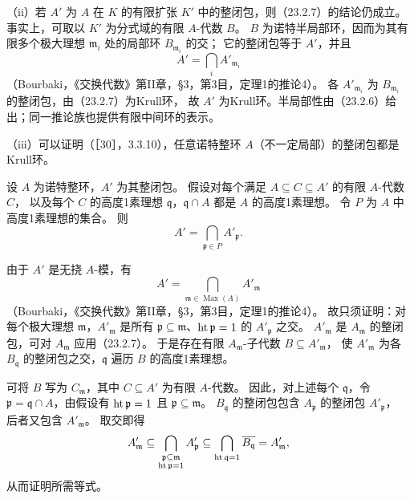 （ii）若 $A'$ 为 $A$ 在 $K$ 的有限扩张 $K'$ 中的整闭包，则（23.2.7）的结论仍成立。
事实上，可取以 $K'$ 为分式域的有限 $A$-代数 $B$。
$B$ 为诺特半局部环，因而为其有限多个极大理想 $\mathfrak m_i$ 处的局部环 $B_{\mathfrak m_i}$ 的交；
它的整闭包等于 $A'$，并且
\[
 A'=\bigcap_i A'_{\mathfrak m_i}
\]
（Bourbaki，《交换代数》第II章，\S3，第3目，定理1的推论4）。
各 $A'_{\mathfrak m_i}$ 为 $B_{\mathfrak m_i}$ 的整闭包，由（23.2.7）为Krull环，
故 $A'$ 为Krull环。半局部性由（23.2.6）给出；同一推论族也提供有限中间环的表示。

（iii）可以证明（［30］，3.3.10），任意诺特整环 $A$（不一定局部）的整闭包都是Krull环。

设 $A$ 为诺特整环，$A'$ 为其整闭包。
假设对每个满足 $A\subseteq C\subseteq A'$ 的有限 $A$-代数 $C$，
以及每个 $C$ 的高度1素理想 $\mathfrak q$，$\mathfrak q\cap A$ 都是 $A$ 的高度1素理想。
令 $P$ 为 $A$ 中高度1素理想的集合。
则
\[
 A'=\bigcap_{\mathfrak p\in P}A'_{\mathfrak p}.
\]

\eproof
由于 $A'$ 是无挠 $A$-模，有
\[
 A'=\bigcap_{\mathfrak m\in\operatorname{Max}(A)}A'_{\mathfrak m}
\]
（Bourbaki，《交换代数》第II章，\S3，第3目，定理1的推论4）。
故只须证明：对每个极大理想 $\mathfrak m$，$A'_{\mathfrak m}$ 是所有
$\mathfrak p\subseteq\mathfrak m$、$\operatorname{ht}\mathfrak p=1$ 的 $A'_{\mathfrak p}$ 之交。
$A'_{\mathfrak m}$ 是 $A_{\mathfrak m}$ 的整闭包，可对 $A_{\mathfrak m}$ 应用（23.2.7）。
于是存在有限 $A_{\mathfrak m}$-子代数 $B\subseteq A'_{\mathfrak m}$，
使 $A'_{\mathfrak m}$ 为各 $B_{\mathfrak q}$ 的整闭包之交，$\mathfrak q$ 遍历 $B$ 的高度1素理想。

可将 $B$ 写为 $C_{\mathfrak m}$，其中 $C\subseteq A'$ 为有限 $A$-代数。
因此，对上述每个 $\mathfrak q$，令 $\mathfrak p=\mathfrak q\cap A$，由假设有
$\operatorname{ht}\mathfrak p=1$ 且 $\mathfrak p\subseteq\mathfrak m$。
$B_{\mathfrak q}$ 的整闭包包含 $A_{\mathfrak p}$ 的整闭包 $A'_{\mathfrak p}$，
后者又包含 $A'_{\mathfrak m}$。
取交即得
\[
 A'_{\mathfrak m}
 \subseteq\bigcap_{\substack{\mathfrak p\subseteq\mathfrak m\\\operatorname{ht}\mathfrak p=1}}A'_{\mathfrak p}
 \subseteq\bigcap_{\operatorname{ht}\mathfrak q=1}\overline{B_{\mathfrak q}}
 =A'_{\mathfrak m},
\]
从而证明所需等式。
\finishproof

